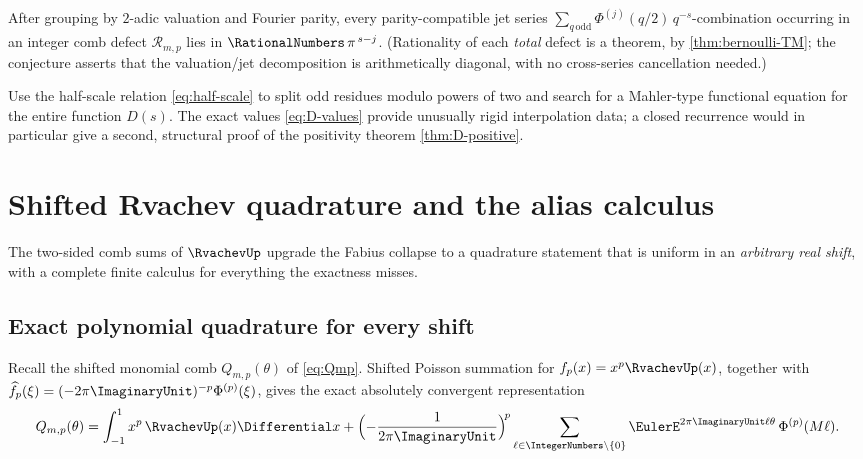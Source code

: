 \documentclass[11pt,oneside]{article}
\numberwithin{equation}{section}
\theoremstyle{definition}
\theoremstyle{remark}
\newcommand{\defect}{\mathcal R}
\begin{document}
\begin{conjecture}
\label{conj:jets}
After grouping by $2$-adic valuation and Fourier parity, every
parity-compatible jet series
$\sum_{q\,\mathrm{odd}}\Phi^{(j)}(q/2)\,q^{-s}$-combination occurring
in an integer comb defect $\defect_{m,p}$ lies in
$\RationalNumbers\,\pi^{\,s-j}$.  (Rationality of each \emph{total} defect is a
theorem, by \cref{thm:bernoulli-TM}; the conjecture asserts that the
valuation/jet decomposition is arithmetically diagonal, with no
cross-series cancellation needed.)
\end{conjecture}

\begin{problem}
\label{prob:D-recurrence}
Use the half-scale relation \eqref{eq:half-scale} to split odd residues
modulo powers of two and search for a Mahler-type functional equation
for the entire function $D(s)$.  The exact values
\eqref{eq:D-values} provide unusually rigid interpolation data; a
closed recurrence would in particular give a second, structural proof
of the positivity theorem \cref{thm:D-positive}.
\end{problem}

\section{Shifted Rvachev quadrature and the alias calculus}
\label{sec:up-comb}

The two-sided comb sums of $\RvachevUp$ upgrade the Fabius collapse to a
quadrature statement that is uniform in an \emph{arbitrary real
shift}, with a complete finite calculus for everything the exactness
misses.

\subsection{Exact polynomial quadrature for every shift}

Recall the shifted monomial comb
$Q_{m,p}(\theta)$ of \eqref{eq:Qmp}.  Shifted Poisson summation for
$f_p(x)=x^{p}\RvachevUp(x)$, together with
$\widehat f_p(\xi)=(-2\pi\ImaginaryUnit)^{-p}\Phi^{(p)}(\xi)$, gives the exact
absolutely convergent representation
\begin{equation}
 Q_{m,p}(\theta)
 =\int_{-1}^{1}x^{p}\,\RvachevUp(x)\Differential x
 +\Bigl(-\frac{1}{2\pi\ImaginaryUnit}\Bigr)^{\!p}
 \sum_{\ell\in\IntegerNumbers\setminus\{0\}}
 \EulerE^{2\pi\ImaginaryUnit\ell\theta}\,\Phi^{(p)}(M\ell).
 \label{eq:Q-Poisson}
\end{equation}
\end{document}

